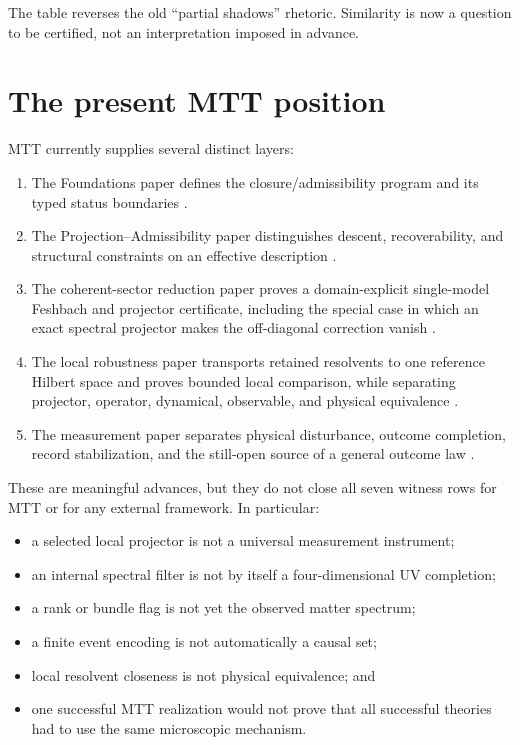 \documentclass[11pt]{article}
\theoremstyle{definition}
\theoremstyle{remark}
\begin{document}
The table reverses the old ``partial shadows'' rhetoric. Similarity is now a
question to be certified, not an interpretation imposed in advance.

\section{The present MTT position}
\label{sec:mtt}

MTT currently supplies several distinct layers:
\begin{enumerate}[label=(\arabic*)]
  \item The Foundations paper defines the closure/admissibility program and its
  typed status boundaries \cite{NeroFoundation2026}.
  \item The Projection--Admissibility paper distinguishes descent,
  recoverability, and structural constraints on an effective description
  \cite{NeroProjection2026}.
  \item The coherent-sector reduction paper proves a domain-explicit
  single-model Feshbach and projector certificate, including the special case
  in which an exact spectral projector makes the off-diagonal correction vanish
  \cite{NeroCoherentReduction2026}.
  \item The local robustness paper transports retained resolvents to one
  reference Hilbert space and proves bounded local comparison, while separating
  projector, operator, dynamical, observable, and physical equivalence
  \cite{NeroLocalRobustness2026}.
  \item The measurement paper separates physical disturbance, outcome
  completion, record stabilization, and the still-open source of a general
  outcome law \cite{NeroMeasurement2026}.
\end{enumerate}

These are meaningful advances, but they do not close all seven witness rows for
MTT or for any external framework. In particular:
\begin{itemize}
  \item a selected local projector is not a universal measurement instrument;
  \item an internal spectral filter is not by itself a four-dimensional UV
  completion;
  \item a rank or bundle flag is not yet the observed matter spectrum;
  \item a finite event encoding is not automatically a causal set;
  \item local resolvent closeness is not physical equivalence; and
  \item one successful MTT realization would not prove that all successful
  theories had to use the same microscopic mechanism.
\end{itemize}
\end{document}
